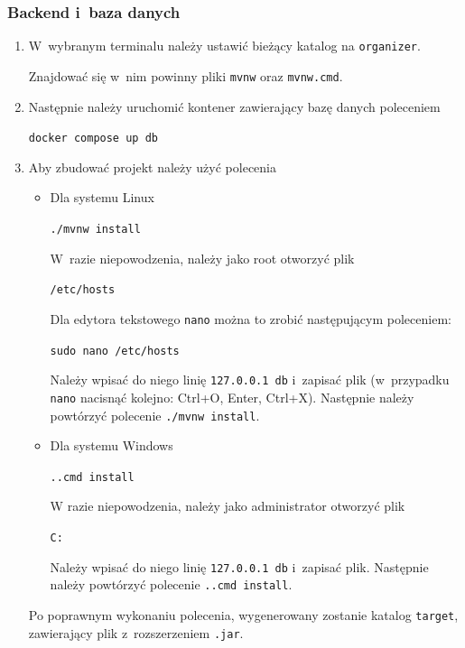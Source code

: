 \documentclass[a4paper,twoside,12pt]{book}
\begin{document}
\subsubsection{Backend i~baza danych}
\begin{enumerate}
   \item W~wybranym terminalu należy ustawić bieżący katalog na \texttt{organizer}. 

Znajdować się w~nim powinny pliki \texttt{mvnw} oraz \texttt{mvnw.cmd}.
   \item Następnie należy uruchomić kontener zawierający bazę danych poleceniem 

\texttt{docker compose up db}
   \item Aby zbudować projekt należy użyć polecenia 

   \begin{itemize}
	\item Dla systemu Linux

	\texttt{./mvnw install}
  
  W~razie niepowodzenia, należy jako root otworzyć plik 
  
  \texttt{/etc/hosts} 
  
  Dla edytora tekstowego \texttt{nano} można to zrobić następującym poleceniem:
  
  \texttt{sudo nano /etc/hosts} 
  
  Należy wpisać do niego linię \texttt{127.0.0.1 db} i~zapisać plik (w~przypadku \texttt{nano} nacisnąć kolejno: Ctrl+O, Enter, Ctrl+X). Następnie należy powtórzyć polecenie \texttt{./mvnw install}.

	\item Dla systemu Windows

	\texttt{.\mvnw.cmd install}

	W razie niepowodzenia, należy jako administrator otworzyć plik 
  
  \texttt{C:\Windows{}\drivers\etc\hosts} 
  
  Należy wpisać do niego linię \texttt{127.0.0.1 db} i~zapisać plik. Następnie należy powtórzyć polecenie \texttt{.\mvnw.cmd install}.
\end{itemize}

 Po poprawnym wykonaniu polecenia, wygenerowany zostanie katalog \texttt{target}, zawierający plik z~rozszerzeniem \texttt{.jar}.


\end{enumerate}
\end{document}
